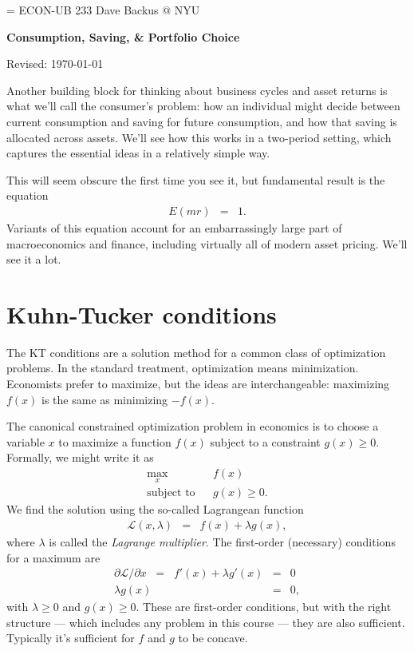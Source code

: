 \documentclass[11pt]{article}
\begin{document}
\parskip=\bigskipamount
\parindent=0.0in
\thispagestyle{empty}
{\large ECON-UB 233 \hfill Dave Backus @ NYU}

\bigskip\bigskip
\centerline{\Large \bf Consumption, Saving, \& Portfolio Choice}
\centerline{Revised: \today}

\medskip
Another building block for thinking about business cycles
and asset returns is what we'll call the consumer's problem:
how an individual might decide between current consumption
and saving for future consumption,
and how that saving is allocated across assets.
We'll see how this works in a two-period setting,
which captures the essential ideas in a relatively simple way.

This will seem obscure the first time you see it,
but fundamental result is the equation
\begin{eqnarray}
    E (mr) &=& 1 .
    \label{eq:E(mr)=1}
\end{eqnarray}
Variants of this equation account for
an embarrassingly large part of macroeconomics and finance,
including virtually all of modern asset pricing.
We'll see it a lot.


\section{Kuhn-Tucker conditions}

The KT conditions are a solution method for a common class of optimization problems.
In the standard treatment, optimization means minimization.
Economists prefer to maximize, but the ideas are interchangeable:
maximizing $f(x)$ is the same as minimizing $-f(x)$.

The canonical constrained optimization problem in economics
is to choose a variable $x$ to maximize a function
$f(x)$ subject to a constraint $g(x) \geq 0$.
Formally, we might write it as
\begin{eqnarray*}
    \max_x && f(x) \\
    \mbox{subject to} && g(x) \geq 0 .
\end{eqnarray*}
We find the solution using the so-called Lagrangean function
\begin{eqnarray*}
    \mathcal{L}(x,\lambda) &=& f(x) + \lambda g(x) ,
\end{eqnarray*}
where $\lambda$ is called the {\it Lagrange multiplier\/}.
The first-order (necessary) conditions for a maximum are
\begin{eqnarray*}
   \partial \mathcal{L}/\partial x \;\;=\;\; f'(x) + \lambda g'(x) &=&  0 \\
   \lambda g(x) &=& 0 ,
\end{eqnarray*}
with  $\lambda \geq 0$ and $g(x) \geq 0$.
These are first-order conditions,
but with the right structure --- which includes any problem in this course ---
they are also sufficient.
Typically it's sufficient for $f$ and $g$ to be concave.
\end{document}
